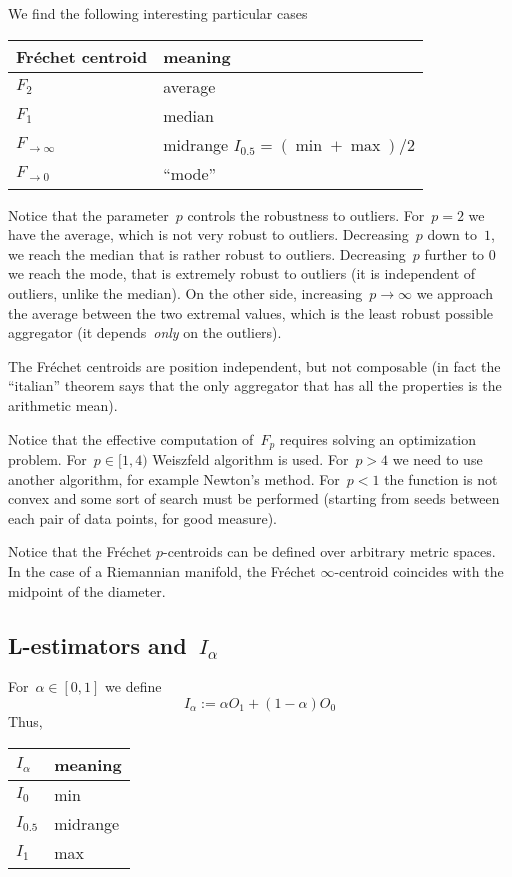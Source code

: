 We find the following interesting particular cases

\medskip

\begin{tabular}{l|l}
	Fréchet centroid & meaning \\
	\hline
	$F_2$ & average \\
	$F_1$ & median \\
	$F_{\to\infty}$ & midrange $I_{0.5}=(\min+\max)/2$ \\
	$F_{\to0}$ & ``mode'' \\
\end{tabular}

\medskip

Notice that the parameter~$p$ controls the robustness to outliers.
For~$p=2$ we have the average, which is not very robust to outliers.
Decreasing~$p$ down to~$1$, we reach the median that is rather robust
to outliers.  Decreasing~$p$ further to 0 we reach the mode, that is
extremely robust to outliers (it is independent of outliers, unlike
the median).  On the other side, increasing~$p\to\infty$ we approach
the average between the two extremal values, which is the least
robust possible aggregator (it depends~\emph{only} on the outliers).


The Fréchet centroids are position independent, but not composable
(in fact the ``italian'' theorem says that the only aggregator that
has all the properties is the arithmetic mean).

Notice that the effective computation of~$F_p$ requires solving an
optimization problem.  For~$p\in[1,4)$ Weiszfeld
algorithm is used.  For~$p>4$ we need to use another algorithm, for
example Newton's method.  For~$p<1$ the function is not convex and
some sort of search must be performed (starting from seeds between
each pair of data points, for good measure).

Notice that the Fréchet $p$-centroids can be defined over arbitrary
metric spaces.  In the case of a Riemannian manifold, the Fréchet
$\infty$-centroid coincides with the midpoint of the diameter.

\medskip

\subsection{L-estimators and~$I_\alpha$}

For~$\alpha\in[0,1]$ we define
\[
	I_{\alpha}:=\alpha O_1 + (1-\alpha) O_0
\]
Thus,
\medskip

\begin{tabular}{l|l}
	$I_\alpha$ & meaning \\
	\hline
	$I_0$ & min \\
	$I_{0.5}$ & midrange \\
	$I_1$ & max \\
\end{tabular}

